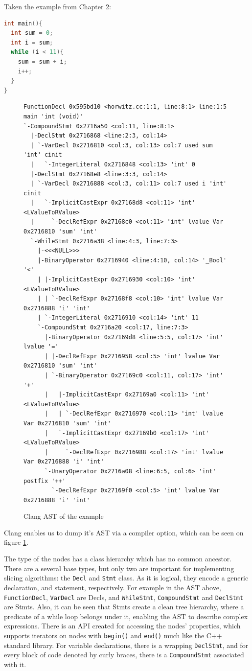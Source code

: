 \documentclass[oneside,12pt,a4paper]{book}
\begin{document}
Taken the example from Chapter 2:
\begin{lstlisting}[language=C++]
int main(){
  int sum = 0;
  int i = sum;
  while (i < 11){
    sum = sum + i;
    i++;
  }
}
\end{lstlisting}
\begin{figure}[h]
\lstset{
xleftmargin=-80pt,
aboveskip=\smallskipamount,
belowskip=\smallskipamount}
\begin{lstlisting}
FunctionDecl 0x595bd10 <horwitz.cc:1:1, line:8:1> line:1:5 main 'int (void)'
`-CompoundStmt 0x2716a50 <col:11, line:8:1>
  |-DeclStmt 0x2716868 <line:2:3, col:14>
  | `-VarDecl 0x2716810 <col:3, col:13> col:7 used sum 'int' cinit
  |   `-IntegerLiteral 0x2716848 <col:13> 'int' 0
  |-DeclStmt 0x27168e8 <line:3:3, col:14>
  | `-VarDecl 0x2716888 <col:3, col:11> col:7 used i 'int' cinit
  |   `-ImplicitCastExpr 0x27168d8 <col:11> 'int' <LValueToRValue>
  |     `-DeclRefExpr 0x27168c0 <col:11> 'int' lvalue Var 0x2716810 'sum' 'int'
  `-WhileStmt 0x2716a38 <line:4:3, line:7:3>
    |-<<<NULL>>>
    |-BinaryOperator 0x2716940 <line:4:10, col:14> '_Bool' '<'
    | |-ImplicitCastExpr 0x2716930 <col:10> 'int' <LValueToRValue>
    | | `-DeclRefExpr 0x27168f8 <col:10> 'int' lvalue Var 0x2716888 'i' 'int'
    | `-IntegerLiteral 0x2716910 <col:14> 'int' 11
    `-CompoundStmt 0x2716a20 <col:17, line:7:3>
      |-BinaryOperator 0x27169d8 <line:5:5, col:17> 'int' lvalue '='
      | |-DeclRefExpr 0x2716958 <col:5> 'int' lvalue Var 0x2716810 'sum' 'int'
      | `-BinaryOperator 0x27169c0 <col:11, col:17> 'int' '+'
      |   |-ImplicitCastExpr 0x27169a0 <col:11> 'int' <LValueToRValue>
      |   | `-DeclRefExpr 0x2716970 <col:11> 'int' lvalue Var 0x2716810 'sum' 'int'
      |   `-ImplicitCastExpr 0x27169b0 <col:17> 'int' <LValueToRValue>
      |     `-DeclRefExpr 0x2716988 <col:17> 'int' lvalue Var 0x2716888 'i' 'int'
      `-UnaryOperator 0x2716a08 <line:6:5, col:6> 'int' postfix '++'
        `-DeclRefExpr 0x27169f0 <col:5> 'int' lvalue Var 0x2716888 'i' 'int'
\end{lstlisting}
\caption{Clang AST of the example}
\label{fig:clang_ast}
\end{figure}

Clang enables us to dump it's AST via a compiler option, which can be seen on figure \ref{fig:clang_ast}.

The type of the nodes has a class hierarchy which has no common ancestor. There are a several base types, but only two are important for implementing slicing algorithms: the \texttt{Decl} and \texttt{Stmt} class. As it is logical, they encode a generic declaration, and statement, respectively. For example in the AST above, \texttt{FunctionDecl}, \texttt{VarDecl} are Decls, and \texttt{WhileStmt}, \texttt{CompoundStmt} and \texttt{DeclStmt} are Stmts. Also, it can be seen that Stmts create a clean tree hierarchy, where a predicate of a while loop belongs under it, enabling the AST to describe complex expressions. There is an API created for accessing the nodes' properties, which supports iterators on nodes with \texttt{begin()} and \texttt{end()} much like the C++ standard library. For variable declarations, there is a wrapping \texttt{DeclStmt}, and for every block of code denoted by curly braces, there is a \texttt{CompoundStmt} associated with it. 
\end{document}
